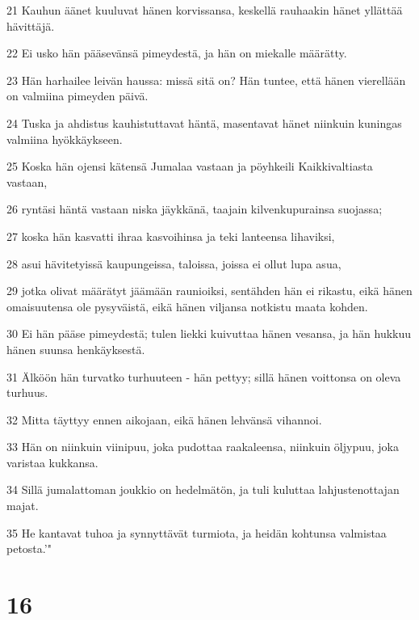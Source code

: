 \par 21 Kauhun äänet kuuluvat hänen korvissansa, keskellä rauhaakin hänet yllättää hävittäjä.
\par 22 Ei usko hän pääsevänsä pimeydestä, ja hän on miekalle määrätty.
\par 23 Hän harhailee leivän haussa: missä sitä on? Hän tuntee, että hänen vierellään on valmiina pimeyden päivä.
\par 24 Tuska ja ahdistus kauhistuttavat häntä, masentavat hänet niinkuin kuningas valmiina hyökkäykseen.
\par 25 Koska hän ojensi kätensä Jumalaa vastaan ja pöyhkeili Kaikkivaltiasta vastaan,
\par 26 ryntäsi häntä vastaan niska jäykkänä, taajain kilvenkupurainsa suojassa;
\par 27 koska hän kasvatti ihraa kasvoihinsa ja teki lanteensa lihaviksi,
\par 28 asui hävitetyissä kaupungeissa, taloissa, joissa ei ollut lupa asua,
\par 29 jotka olivat määrätyt jäämään raunioiksi, sentähden hän ei rikastu, eikä hänen omaisuutensa ole pysyväistä, eikä hänen viljansa notkistu maata kohden.
\par 30 Ei hän pääse pimeydestä; tulen liekki kuivuttaa hänen vesansa, ja hän hukkuu hänen suunsa henkäyksestä.
\par 31 Älköön hän turvatko turhuuteen - hän pettyy; sillä hänen voittonsa on oleva turhuus.
\par 32 Mitta täyttyy ennen aikojaan, eikä hänen lehvänsä vihannoi.
\par 33 Hän on niinkuin viinipuu, joka pudottaa raakaleensa, niinkuin öljypuu, joka varistaa kukkansa.
\par 34 Sillä jumalattoman joukkio on hedelmätön, ja tuli kuluttaa lahjustenottajan majat.
\par 35 He kantavat tuhoa ja synnyttävät turmiota, ja heidän kohtunsa valmistaa petosta.'"

\chapter{16}

